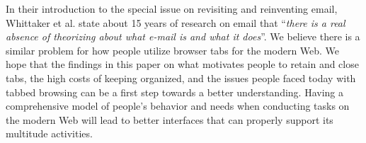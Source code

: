 In their introduction to the special issue on revisiting and reinventing email, Whittaker et al. state about 15 years of research on email that ``\emph{there is a real absence of theorizing about what e-mail is and what it does}''.  We believe there is a similar problem for how people utilize browser tabs for the modern Web. We hope that the findings in this paper on what motivates people to retain and close tabs, the high costs of keeping organized, and the issues people faced today with tabbed browsing can be a first step towards a better understanding. Having a comprehensive model of people's behavior and needs when conducting tasks on the modern Web will lead to better interfaces that can properly support its multitude activities.





\balance{}



